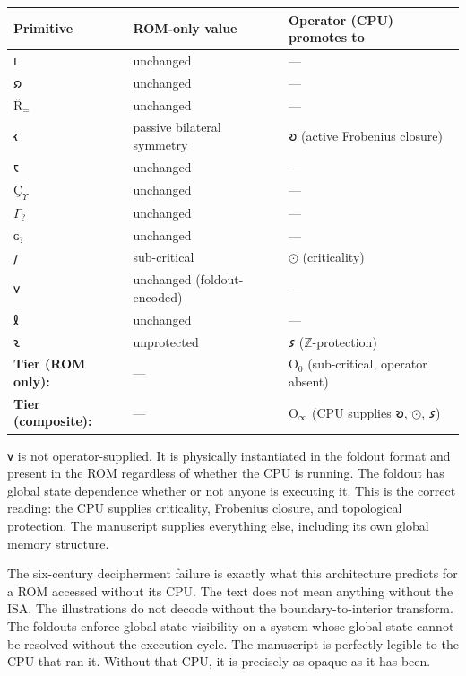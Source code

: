 \documentclass[12pt,a4paper]{article}
\begin{document}
\begin{table}[htbp]
\centering
\small
{}
\begin{tabularx}{\textwidth}{>{\centering\arraybackslash}X >{\centering\arraybackslash}X >{\raggedright\arraybackslash}X}
\toprule
\rowcolor{gray!25}\textbf{Primitive} & \textbf{ROM-only value} & \textbf{Operator (CPU) promotes to} \\
\midrule
\rowcolors{1}{white}{gray!10}
$𐑦$         & unchanged        & --- \\
$𐑸$              & unchanged        & --- \\
$\text{Ř}_{=}$            & unchanged        & --- \\
$𐑬$                & passive bilateral symmetry & $𐑹$ (active Frobenius closure) \\
$𐑱$           & unchanged        & --- \\
$\text{Ç}_\Upsilon$       & unchanged        & --- \\
$\Gamma_?$                & unchanged        & --- \\
$\text{ɢ}_?$              & unchanged        & --- \\
$𐑢$         & sub-critical     & $⊙$ (criticality) \\
𐑫         & unchanged (foldout-encoded) & --- \\
$𐑙$            & unchanged        & --- \\
$𐑷$                & unprotected      & $𐑭$ ($\mathbb{Z}$-protection) \\
\midrule
\rowcolors{1}{white}{white}
\textbf{Tier (ROM only):} & --- & O$_0$ (sub-critical, operator absent) \\
\textbf{Tier (composite):} & --- & O$_\infty$ (CPU supplies $𐑹$, $⊙$, $𐑭$) \\
\bottomrule
\end{tabularx}
\end{table}

𐑫 is not operator-supplied. It is physically instantiated in the foldout format and present in the ROM regardless of whether the CPU is running. The foldout has global state dependence whether or not anyone is executing it. This is the correct reading: the CPU supplies criticality, Frobenius closure, and topological protection. The manuscript supplies everything else, including its own global memory structure.

The six-century decipherment failure is exactly what this architecture predicts for a ROM accessed without its CPU. The text does not mean anything without the ISA. The illustrations do not decode without the boundary-to-interior transform. The foldouts enforce global state visibility on a system whose global state cannot be resolved without the execution cycle. The manuscript is perfectly legible to the CPU that ran it. Without that CPU, it is precisely as opaque as it has been.
\end{document}
